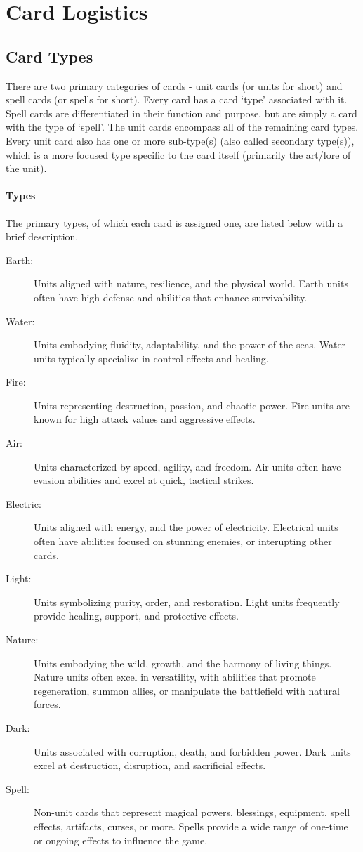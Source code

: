 \chapter{Card Logistics}





\section{Card Types}

There are two primary categories of cards - unit cards (or units for short) and spell cards (or spells for short). Every card has a card `type' associated with it. Spell cards are differentiated in their function and purpose, but are simply a card with the type of `spell'. The unit cards encompass all of the remaining card types. Every unit card also has one or more sub-type(s) (also called secondary type(s)), which is a more focused type specific to the card itself (primarily the art/lore of the unit).

\subsubsection{Types}
The primary types, of which each card is assigned one, are listed below with a brief description.
\begin{description}
  \item[Earth:] Units aligned with nature, resilience, and the physical world. Earth units often have high defense and abilities that enhance survivability.
  \item[Water:] Units embodying fluidity, adaptability, and the power of the seas. Water units typically specialize in control effects and healing.
  \item[Fire:] Units representing destruction, passion, and chaotic power. Fire units are known for high attack values and aggressive effects.
  \item[Air:] Units characterized by speed, agility, and freedom. Air units often have evasion abilities and excel at quick, tactical strikes.
  \item[Electric:] Units aligned with energy, and the power of electricity. Electrical units often have abilities focused on stunning enemies, or interupting other cards.
  \item[Light:] Units symbolizing purity, order, and restoration. Light units frequently provide healing, support, and protective effects.
  \item[Nature:] Units embodying the wild, growth, and the harmony of living things. Nature units often excel in versatility, with abilities that promote regeneration, summon allies, or manipulate the battlefield with natural forces.
  \item[Dark:] Units associated with corruption, death, and forbidden power. Dark units excel at destruction, disruption, and sacrificial effects.
  \item[Spell:] Non-unit cards that represent magical powers, blessings, equipment, spell effects, artifacts, curses, or more. Spells provide a wide range of one-time or ongoing effects to influence the game.
\end{description}

